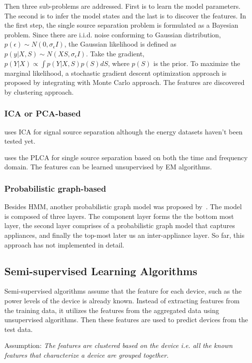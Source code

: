 Then three sub-problems are addressed. First is to learn the model parameters. 
The second is to infer the model states and the last is to discover the features. 
In the first step, the single source separation problem is formulated as a Bayesian problem. 
Since there are i.i.d. noise conforming to Gaussian distribution, 
$p(\epsilon) \sim N(0, \sigma_{\epsilon}I)$, 
the Gaussian likelihood is defined as $p(y|X, S) \sim N(XS, \sigma_{\epsilon}I)$. 
Take the gradient, 
$p({Y}|X) \propto \int p(Y|X, S) p(S) dS$, where $p(S)$ is the prior. 
To maximize the marginal likelihood, 
a stochastic gradient descent optimization approach is proposed by 
integrating with Monte Carlo approach. 
The features are discovered by clustering approach. 

\subsubsection{ICA or PCA-based}
\cite{davies2007source} uses ICA for signal source separation although 
the energy datasets haven't been tested yet. 

\cite{smaragdis2006probabilistic} uses the PLCA for single source separation based on 
both the time and frequency domain.
The features can be learned unsupervised by EM algorithms.
\fi

\subsubsection{Probabilistic graph-based}
Besides HMM, another probabilistic graph model was proposed by~\cite{kelly2012disaggregating}. 
The model is composed of three layers. The component layer forms the the bottom most layer, 
the second layer comprises of a probabilistic graph model that captures appliances, and
finally the top-most later us an inter-appliance layer. 
So far, this approach has not implemented in detail. 


\subsection{Semi-supervised Learning Algorithms}
Semi-supervised algorithms assume that the feature for each device, such as the power levels of 
the device is already known.
Instead of extracting features from the training data, 
it utilizes the features from the aggregated data using unsupervised algorithms. 
Then these features are used to predict devices from the test data. 

Assumption: \textit{The features are clustered based on the device i.e. all the known features
that characterize a device are grouped together.} 

